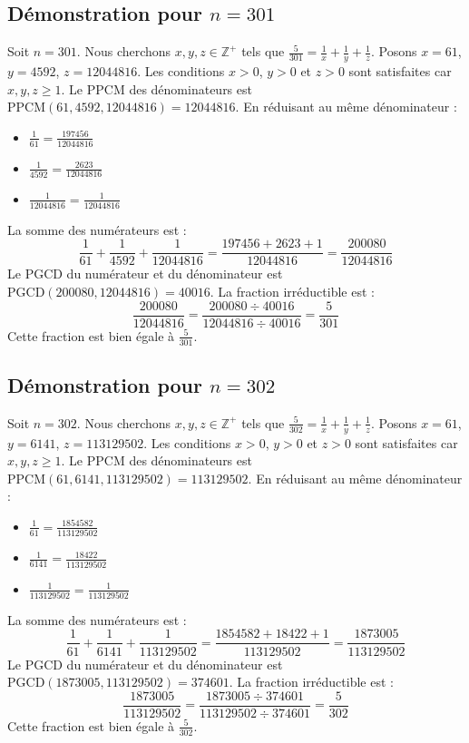 \documentclass[11pt,a4paper]{article}
\begin{document}
\subsection{Démonstration pour $n = 301$}
Soit $n = 301$. Nous cherchons $x, y, z \in \mathbb{Z}^{+}$ tels que $\frac{5}{301} = \frac{1}{x} + \frac{1}{y} + \frac{1}{z}$.
Posons $x = 61$, $y = 4592$, $z = 12044816$.
Les conditions $x > 0$, $y > 0$ et $z > 0$ sont satisfaites car $x, y, z \geq 1$.
Le PPCM des dénominateurs est $\text{PPCM}(61, 4592, 12044816) = 12044816$.
En réduisant au même dénominateur :
\begin{itemize}
    \item $\frac{1}{61} = \frac{197456}{12044816}$
    \item $\frac{1}{4592} = \frac{2623}{12044816}$
    \item $\frac{1}{12044816} = \frac{1}{12044816}$
\end{itemize}
La somme des numérateurs est :
$$ \frac{1}{61} + \frac{1}{4592} + \frac{1}{12044816} = \frac{197456 + 2623 + 1}{12044816} = \frac{200080}{12044816} $$
Le PGCD du numérateur et du dénominateur est $\text{PGCD}(200080, 12044816) = 40016$.
La fraction irréductible est :
$$ \frac{200080}{12044816} = \frac{200080 \div 40016}{12044816 \div 40016} = \frac{5}{301} $$
Cette fraction est bien égale à $\frac{5}{301}$.

\subsection{Démonstration pour $n = 302$}
Soit $n = 302$. Nous cherchons $x, y, z \in \mathbb{Z}^{+}$ tels que $\frac{5}{302} = \frac{1}{x} + \frac{1}{y} + \frac{1}{z}$.
Posons $x = 61$, $y = 6141$, $z = 113129502$.
Les conditions $x > 0$, $y > 0$ et $z > 0$ sont satisfaites car $x, y, z \geq 1$.
Le PPCM des dénominateurs est $\text{PPCM}(61, 6141, 113129502) = 113129502$.
En réduisant au même dénominateur :
\begin{itemize}
    \item $\frac{1}{61} = \frac{1854582}{113129502}$
    \item $\frac{1}{6141} = \frac{18422}{113129502}$
    \item $\frac{1}{113129502} = \frac{1}{113129502}$
\end{itemize}
La somme des numérateurs est :
$$ \frac{1}{61} + \frac{1}{6141} + \frac{1}{113129502} = \frac{1854582 + 18422 + 1}{113129502} = \frac{1873005}{113129502} $$
Le PGCD du numérateur et du dénominateur est $\text{PGCD}(1873005, 113129502) = 374601$.
La fraction irréductible est :
$$ \frac{1873005}{113129502} = \frac{1873005 \div 374601}{113129502 \div 374601} = \frac{5}{302} $$
Cette fraction est bien égale à $\frac{5}{302}$.
\end{document}
